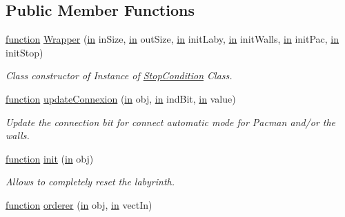 \subsection*{Public Member Functions}
\begin{DoxyCompactItemize}
\item 
\hyperlink{_plan__desuma_functions_8m_ac2ffb26d6f42d3bbcd7847b0873403f4}{function} \hyperlink{class_wrapper_ab0ebf6c7738beb446d13d2d9445fbc8a}{Wrapper} (\hyperlink{class_wrapper_a5e252d97ca5bf85c5753e2914673eead}{in} in\+Size, \hyperlink{class_wrapper_a5e252d97ca5bf85c5753e2914673eead}{in} out\+Size, \hyperlink{class_wrapper_a5e252d97ca5bf85c5753e2914673eead}{in} init\+Laby, \hyperlink{class_wrapper_a5e252d97ca5bf85c5753e2914673eead}{in} init\+Walls, \hyperlink{class_wrapper_a5e252d97ca5bf85c5753e2914673eead}{in} init\+Pac, \hyperlink{class_wrapper_a5e252d97ca5bf85c5753e2914673eead}{in} init\+Stop)
\begin{DoxyCompactList}\small\item\em Class constructor of Instance of \hyperlink{class_stop_condition}{Stop\+Condition} Class. \end{DoxyCompactList}\item 
\hyperlink{_plan__desuma_functions_8m_ac2ffb26d6f42d3bbcd7847b0873403f4}{function} \hyperlink{class_wrapper_aa41b9b215897635f48e1c8a4eaca7640}{update\+Connexion} (\hyperlink{class_wrapper_a5e252d97ca5bf85c5753e2914673eead}{in} obj, \hyperlink{class_wrapper_a5e252d97ca5bf85c5753e2914673eead}{in} ind\+Bit, \hyperlink{class_wrapper_a5e252d97ca5bf85c5753e2914673eead}{in} value)
\begin{DoxyCompactList}\small\item\em Update the connection bit for connect automatic mode for Pacman and/or the walls. \end{DoxyCompactList}\item 
\hyperlink{_plan__desuma_functions_8m_ac2ffb26d6f42d3bbcd7847b0873403f4}{function} \hyperlink{class_wrapper_a7d486dd79e7c7bc857ffaa4e273d27c5}{init} (\hyperlink{class_wrapper_a5e252d97ca5bf85c5753e2914673eead}{in} obj)
\begin{DoxyCompactList}\small\item\em Allows to completely reset the labyrinth. \end{DoxyCompactList}\item 
\hyperlink{_plan__desuma_functions_8m_ac2ffb26d6f42d3bbcd7847b0873403f4}{function} \hyperlink{class_wrapper_a9c889c73b9d4b80dde64dfe385ed747e}{orderer} (\hyperlink{class_wrapper_a5e252d97ca5bf85c5753e2914673eead}{in} obj, \hyperlink{class_wrapper_a5e252d97ca5bf85c5753e2914673eead}{in} vect\+In)

\end{DoxyCompactItemize}
